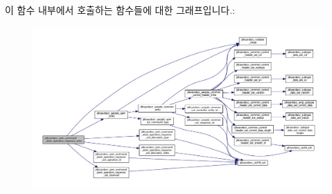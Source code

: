 이 함수 내부에서 호출하는 함수들에 대한 그래프입니다.\+:
\nopagebreak
\begin{figure}[H]
\begin{center}
\leavevmode
\includegraphics[width=350pt]{group__command__abort__operation__response_ga799f8fe0910acbf69d8083664feae4af_cgraph}
\end{center}
\end{figure}


